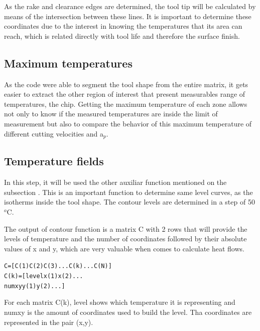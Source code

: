 		As the rake and clearance edges are determined, the tool tip will be calculated by means of the intersection between these lines. It is important to determine these coordinates due to the interest in knowing the temperatures that its area can reach, which is related directly with tool life and therefore the surface finish.

	\subsection{Maximum temperatures}

	As the code were able to segment the tool shape from the entire matrix, it gets easier to extract the other region of interest that present measurables range of temperatures, the chip. Getting the maximum temperature of each zone allows not only to know if the measured temperatures are inside the limit of measurement but also to compare the behavior of this maximum temperature of different cutting velocities and a$_{p}$.

	\subsection{Temperature fields}

	In this step, it will be used the other auxiliar function mentioned on the subsection . This is an important function to determine same level curves, as the isotherms inside the tool shape. The contour levels are determined in a step of 50 $^{o}$C.

	
	

	The output of contour function is a matrix C with 2 rows that will provide the levels of temperature and the number of coordinates followed by their absolute values of x and y, which are very valuable when comes to calculate heat flows.

		\begin{mdframed}[backgroundcolor=lightgray!25!]
		\begin{alltt}\fontsize{9pt}{8pt}\selectfont
		C =     [C(1) C(2) C(3) ...C(k)... C(N)]
		C(k) =  [level x(1) x(2)...
		         numxy y(1) y(2)...]
		\end{alltt}
		\end{mdframed}
	
	For each matrix C(k), level shows which temperature it is representing and numxy is the amount of coordinates used to build the level. Tha coordinates are represented in the pair (x,y).

